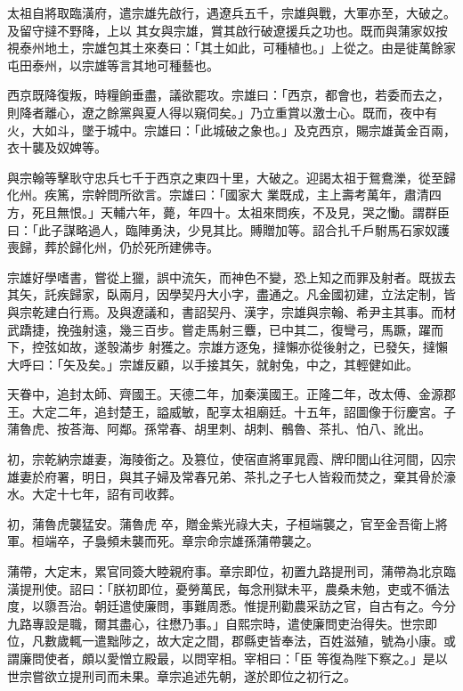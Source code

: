 \begin{pinyinscope}
 太祖自將取臨潢府，遣宗雄先啟行，遇遼兵五千，宗雄與戰，大軍亦至，大破之。及留守撻不野降，上以
 其女與宗雄，賞其啟行破遼援兵之功也。既而與蒲家奴按視泰州地土，宗雄包其土來奏曰：「其土如此，可種植也。」上從之。由是徙萬餘家屯田泰州，以宗雄等言其地可種藝也。



 西京既降復叛，時糧餉垂盡，議欲罷攻。宗雄曰：「西京，都會也，若委而去之，則降者離心，遼之餘黨與夏人得以窺伺矣。」乃立重賞以激士心。既而，夜中有火，大如斗，墜于城中。宗雄曰：「此城破之象也。」及克西京，賜宗雄黃金百兩，衣十襲及奴婢等。



 與宗翰等擊耿守忠兵七千于西京之東四十里，大破之。迎謁太祖于鴛鴦濼，從至歸化州。疾篤，宗幹問所欲言。宗雄曰：「國家大
 業既成，主上壽考萬年，肅清四方，死且無恨。」天輔六年，薨，年四十。太祖來問疾，不及見，哭之慟。謂群臣曰：「此子謀略過人，臨陣勇決，少見其比。賻贈加等。詔合扎千戶駙馬石家奴護喪歸，葬於歸化州，仍於死所建佛寺。



 宗雄好學嗜書，嘗從上獵，誤中流矢，而神色不變，恐上知之而罪及射者。既拔去其矢，託疾歸家，臥兩月，因學契丹大小字，盡通之。凡金國初建，立法定制，皆與宗乾建白行焉。及與遼議和，書詔契丹、漢字，宗雄與宗翰、希尹主其事。而材武蹻捷，挽強射遠，幾三百步。嘗走馬射三麞，已中其二，復彎弓，馬蹶，躍而下，控弦如故，遂彀滿步
 射獲之。宗雄方逐兔，撻懶亦從後射之，已發矢，撻懶大呼曰：「矢及矣。」宗雄反顧，以手接其矢，就射兔，中之，其輕健如此。



 天眷中，追封太師、齊國王。天德二年，加秦漢國王。正隆二年，改太傅、金源郡王。大定二年，追封楚王，謚威敏，配享太祖廟廷。十五年，詔圖像于衍慶宮。子蒲魯虎、按荅海、阿鄰。孫常春、胡里刺、胡刺、鶻魯、茶扎、怕八、訛出。



 初，宗乾納宗雄妻，海陵銜之。及篡位，使宿直將軍晁霞、牌印閭山往河間，囚宗雄妻於府署，明日，與其子婦及常春兄弟、茶扎之子七人皆殺而焚之，棄其骨於濠水。大定十七年，詔有司收葬。



 初，蒲魯虎襲猛安。蒲魯虎
 卒，贈金紫光祿大夫，子桓端襲之，官至金吾衛上將軍。桓端卒，子裊頻未襲而死。章宗命宗雄孫蒲帶襲之。



 蒲帶，大定末，累官同簽大睦親府事。章宗即位，初置九路提刑司，蒲帶為北京臨潢提刑使。詔曰：「朕初即位，憂勞萬民，每念刑獄未平，農桑未勉，吏或不循法度，以隳吾治。朝廷遣使廉問，事難周悉。惟提刑勸農采訪之官，自古有之。今分九路專設是職，爾其盡心，往懋乃事。」自熙宗時，遣使廉問吏治得失。世宗即位，凡數歲輒一遣黜陟之，故大定之間，郡縣吏皆奉法，百姓滋殖，號為小康。或謂廉問使者，頗以愛憎立殿最，以問宰相。宰相曰：「臣
 等復為陛下察之。」是以世宗嘗欲立提刑司而未果。章宗追述先朝，遂於即位之初行之。




\end{pinyinscope}
